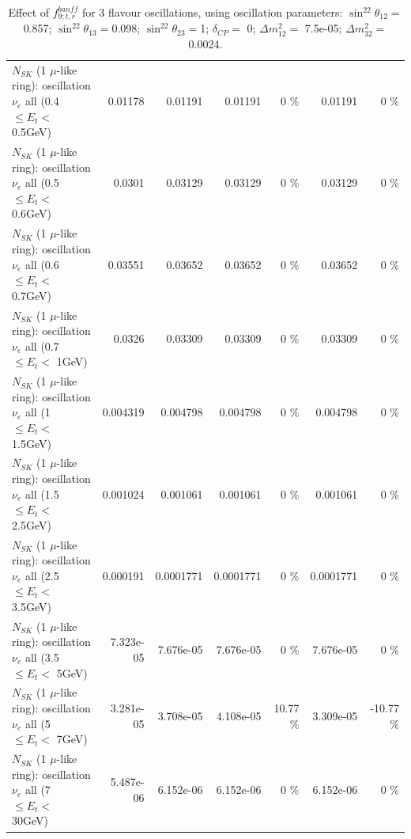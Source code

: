 \begin{table}
\begin{tabular}{| l | r | r | r  r | r  r |}
$N_{SK}$ (1 $\mu$-like ring): oscillation $\nu_{e}$ all (0.4 $\leq E_{t} <$ 0.5GeV) &         0.01178 &         0.01191 &         0.01191 &        0 \%  &         0.01191 &        0 \%  \\ 
$N_{SK}$ (1 $\mu$-like ring): oscillation $\nu_{e}$ all (0.5 $\leq E_{t} <$ 0.6GeV) &          0.0301 &         0.03129 &         0.03129 &        0 \%  &         0.03129 &        0 \%  \\ 
$N_{SK}$ (1 $\mu$-like ring): oscillation $\nu_{e}$ all (0.6 $\leq E_{t} <$ 0.7GeV) &         0.03551 &         0.03652 &         0.03652 &        0 \%  &         0.03652 &        0 \%  \\ 
$N_{SK}$ (1 $\mu$-like ring): oscillation $\nu_{e}$ all (0.7 $\leq E_{t} <$ 1GeV) &          0.0326 &         0.03309 &         0.03309 &        0 \%  &         0.03309 &        0 \%  \\ 
$N_{SK}$ (1 $\mu$-like ring): oscillation $\nu_{e}$ all (1 $\leq E_{t} <$ 1.5GeV) &        0.004319 &        0.004798 &        0.004798 &        0 \%  &        0.004798 &        0 \%  \\ 
$N_{SK}$ (1 $\mu$-like ring): oscillation $\nu_{e}$ all (1.5 $\leq E_{t} <$ 2.5GeV) &        0.001024 &        0.001061 &        0.001061 &        0 \%  &        0.001061 &        0 \%  \\ 
$N_{SK}$ (1 $\mu$-like ring): oscillation $\nu_{e}$ all (2.5 $\leq E_{t} <$ 3.5GeV) &        0.000191 &       0.0001771 &       0.0001771 &        0 \%  &       0.0001771 &        0 \%  \\ 
$N_{SK}$ (1 $\mu$-like ring): oscillation $\nu_{e}$ all (3.5 $\leq E_{t} <$ 5GeV) &       7.323e-05 &       7.676e-05 &       7.676e-05 &        0 \%  &       7.676e-05 &        0 \%  \\ 
 $N_{SK}$ (1 $\mu$-like ring): oscillation $\nu_{e}$ all (5 $\leq E_{t} <$ 7GeV) &       3.281e-05 &       3.708e-05 &       4.108e-05 &    10.77 \%  &       3.309e-05 &   -10.77 \%  \\ 
$N_{SK}$ (1 $\mu$-like ring): oscillation $\nu_{e}$ all (7 $\leq E_{t} <$ 30GeV) &       5.487e-06 &       6.152e-06 &       6.152e-06 &        0 \%  &       6.152e-06 &        0 \%  \\ 
\hline
\hline
\end{tabular}
\caption{ Effect of $f_{9; t, r}^{banff}$ for 3 flavour oscillations, using oscillation parameters:  $\sin^22\theta_{12} = $0.857; $\sin^22\theta_{13} = $0.098; $\sin^22\theta_{23} = $1; $\delta_{CP} = $        0; $\Delta m^2_{12} = $    7.5e-05; $\Delta m^2_{32} = $    0.0024. }
\label{tab:num_banff_09_1RmuT_3f_osc_t13:0.098}
\end{table}
